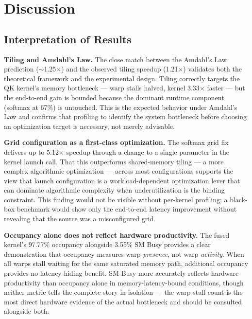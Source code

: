 \documentclass{article}
\begin{document}
\section{Discussion}
\label{sec:discussion}

\subsection{Interpretation of Results}

\textbf{Tiling and Amdahl's Law.}
The close match between the Amdahl's Law prediction ($\sim$1.25$\times$)
and the observed tiling speedup (1.21$\times$) validates both the theoretical
framework and the experimental design. Tiling correctly targets the QK
kernel's memory bottleneck — warp stalls halved, kernel 3.33$\times$ faster
— but the end-to-end gain is bounded because the dominant runtime component
(softmax at 67\%) is untouched. This is the expected behavior under Amdahl's
Law and confirms that profiling to identify the system bottleneck before
choosing an optimization target is necessary, not merely advisable.

\textbf{Grid configuration as a first-class optimization.}
The softmax grid fix delivers up to 5.12$\times$ speedup through a change
to a single parameter in the kernel launch call. That this outperforms
shared-memory tiling — a more complex algorithmic optimization — across most
configurations supports the view that launch configuration is a
workload-dependent optimization lever that can dominate algorithmic
complexity when underutilization is the binding constraint. This finding
would not be visible without per-kernel profiling; a black-box benchmark
would show only the end-to-end latency improvement without revealing that
the source was a misconfigured grid.

\textbf{Occupancy alone does not reflect hardware productivity.}
The fused kernel's 97.77\% occupancy alongside 3.55\% SM Busy provides
a clear demonstration that occupancy measures warp \textit{presence}, not
warp \textit{activity}. When all warps stall waiting for the same saturated
memory path, additional occupancy provides no latency hiding benefit.
SM Busy more accurately reflects hardware productivity than occupancy alone
in memory-latency-bound conditions, though neither metric tells the complete
story in isolation — the warp stall count is the most direct hardware
evidence of the actual bottleneck and should be consulted alongside both.
\end{document}
